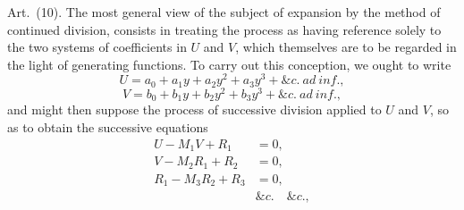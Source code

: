 \documentclass[11pt]{article}
\newcommand{\art}[1]{\par\smallskip\noindent Art.~(#1).\quad}
\begin{document}
\art{10} The most general view of the subject of expansion by the method of continued division, consists in treating the process as having reference solely to the two systems of coefficients in $U$ and $V$, which themselves are to be regarded in the light of generating functions. To carry out this conception, we ought to write
\[
U=a_0+a_1y+a_2y^2+a_3y^3+\&c.\ ad\ inf.,
\]
\[
V=b_0+b_1y+b_2y^2+b_3y^3+\&c.\ ad\ inf.,
\]
and might then suppose the process of successive division applied to $U$ and $V$, so as to obtain the successive equations
\[
\begin{aligned}
U-M_1V+R_1&=0,\\
V-M_2R_1+R_2&=0,\\
R_1-M_3R_2+R_3&=0,\\
&\&c.\quad\&c.,
\end{aligned}
\]
\end{document}
